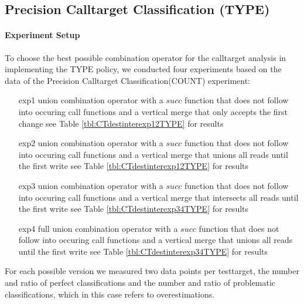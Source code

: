 %
%


\subsection{Precision Calltarget Classification (TYPE)}
\label{subsection:typeshieldprecision}

\paragraph{Experiment Setup}
To choose the best possible combination operator for the calltarget analysis in implementing the TYPE policy, we conducted four experiments based on the data of the Precision Calltarget Classification(COUNT) experiment:
\begin{enumerate}
\item[exp1] union combination operator with a $succ$ function that does not follow into occuring call functions and a vertical merge that only accepts the first change see Table \ref{tbl:CTdestinterexp12TYPE} for results
\item[exp2] union combination operator with a $succ$ function that does not follow into occuring call functions  and a vertical merge that unions all reads until the first write see Table \ref{tbl:CTdestinterexp12TYPE} for results
\item[exp3] union combination operator with a $succ$ function that does not follow into occuring call functions  and a vertical merge that intersects all reads until the first write see Table \ref{tbl:CTdestinterexp34TYPE} for results
\item[exp4] full union combination operator with a $succ$ function that does not follow into occuring call functions and a vertical merge that unions all reads until the first write  see Table \ref{tbl:CTdestinterexp34TYPE} for results
\end{enumerate}
For each possible version we measured two data points per testtarget, the number and ratio of perfect classifications and the number and ratio of problematic classifications, which in this case refers to overestimations.

